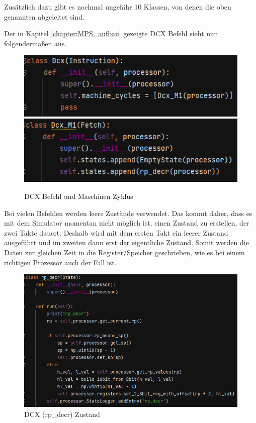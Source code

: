\documentclass[12pt]{article}
\newcommand{\imgSpaceBefore}{\vspace{10pt}}
\begin{document}
\noindent
Zusätzlich dazu gibt es nochmal ungefähr 10 Klassen, von denen die oben genannten abgeleitet sind.

\noindent
Der in Kapitel \ref{chapter:MPS_aufbau} gezeigte DCX Befehl sieht nun folgendermaßen aus.

\imgSpaceBefore
\begin{figure}[H]
\centering
\includegraphics[width=15cm]{bilder/dcx_inst}
\includegraphics[width=15cm]{bilder/dcx_mc}
\caption{DCX Befehl und Maschinen Zyklus}
\label{fig:Dcx_instr}
\end{figure}

\noindent
Bei vielen Befehlen werden leere Zustände verwendet. Das kommt daher, dass es mit dem Simulator momentan nicht möglich ist, einen Zustand zu erstellen, der zwei Takte dauert. Deshalb wird mit dem ersten Takt ein leerer Zustand ausgeführt und im zweiten dann erst der eigentliche Zustand. Somit werden die Daten zur gleichen Zeit in die Register/Speicher geschrieben, wie es bei einem richtigen Prozessor auch der Fall ist.

\imgSpaceBefore
\begin{figure}[H]
\centering
\includegraphics[width=15cm]{bilder/dcx_state}
\caption{DCX (rp\_decr) Zustand}
\label{fig:Dcx_state}
\end{figure}
\end{document}
